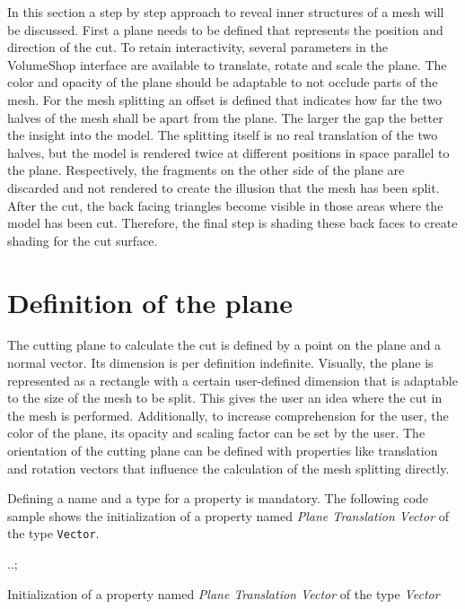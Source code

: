 
In this section a step by step approach to reveal inner structures of a mesh will be discussed. First a plane needs to be defined that represents the position and direction of the cut. To retain interactivity, several parameters in the VolumeShop interface are available to translate, rotate and scale the plane. The color and opacity of the plane should be adaptable to not occlude parts of the mesh. For the mesh splitting an offset is defined that indicates how far the two halves of the mesh shall be apart from the plane. The larger the gap the better the insight into the model. The splitting itself is no real translation of the two halves, but the model is rendered twice at different positions in space parallel to the plane. Respectively, the fragments on the other side of the plane are discarded and not rendered to create the illusion that the mesh has been split. After the cut, the back facing triangles become visible in those areas where the model has been cut. Therefore, the final step is shading these back faces to create shading for the cut surface.

\section{Definition of the plane}
\label{chap:planeDefinition}
The cutting plane to calculate the cut is defined by a point on the plane and a normal vector. Its dimension is per definition indefinite. Visually, the plane is represented as a rectangle with a certain user-defined dimension that is adaptable to the size of the mesh to be split. This gives the user an idea where the cut in the mesh is performed. Additionally, to increase comprehension for the user, the color of the plane, its opacity and scaling factor can be set by the user. The orientation of the cutting plane can be defined with properties like translation and rotation vectors that influence the calculation of the mesh splitting directly.

Defining a name and a type for a property is mandatory. The following code sample shows the initialization of a property named \emph{Plane Translation Vector} of the type \texttt{Vector}.

\IncMargin{1em}
\begin{algorithm}
\plugin{}..;
\BlankLine
\caption{Initialization of a property named \emph{Plane Translation Vector} of the type \emph{Vector}}
\end{algorithm}
\DecMargin{1em}

